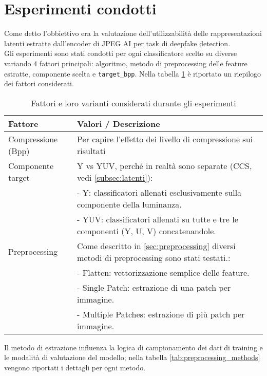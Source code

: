 \section{Esperimenti condotti}
Come detto l'obbiettivo era la valutazione dell'utilizzabilità delle rappresentazioni latenti estratte dall'encoder di JPEG AI per task di deepfake detection.\\
Gli esperimenti sono stati condotti per ogni classificatore scelto su diverse variando 4 fattori principali: algoritmo, metodo di preprocessing delle feature estratte, componente scelta e \texttt{target\_bpp}. Nella tabella \ref{tab:experimentalfactors} è riportato un riepilogo dei fattori considerati.
\begin{table}[H]
\centering
\caption{Fattori e loro varianti considerati durante gli esperimenti}\label{tab:experimentalfactors}
\begin{tabularx}{\textwidth}{l X}
\toprule
\textbf{Fattore} & \textbf{Valori / Descrizione} \\
\midrule
Compressione (Bpp) & Per capire l'effetto dei livello di compressione sui risultati \\
\midrule
Componente target & Y vs YUV, perché in realtà sono separate (CCS, vedi \ref{subsec:latenti}): \\
& - Y: classificatori allenati esclusivamente sulla componente della luminanza. \\
& - YUV: classificatori allenati su tutte e tre le componenti (Y, U, V) concatenandole. \\
\midrule
Preprocessing & Come descritto in \ref{sec:preprocessing} diversi metodi di preprocessing sono stati testati.: \\
& - Flatten: vettorizzazione semplice delle feature. \\
& - Single Patch: estrazione di una patch per immagine. \\
& - Multiple Patches: estrazione di più patch per immagine. \\
\bottomrule
\end{tabularx}
\end{table}
Il metodo di estrazione influenza la logica di campionamento dei dati di training e le modalità di valutazione del modello; nella tabella \ref{tab:preprocessing_methods} vengono riportati i dettagli per ogni metodo.
